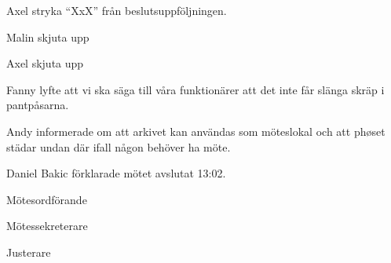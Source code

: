 \documentclass[10pt]{article}
\def\mo{Daniel Bakic}
\def\ms{Axel Voss}
\def\ji{Malin Heyden}
\begin{document}
\begin{paragrafer}
	
	
	Axel \ypa stryka ``XxX'' från beslutsuppföljningen. 

	\Mbaby 

	Malin \ypa skjuta upp 

	Axel \ypa skjuta upp
	
	
	
	
	Fanny lyfte att vi ska säga till våra funktionärer att det inte får slänga skräp i pantpåsarna. 

	Andy informerade om att arkivet kan användas som möteslokal och att phøset städar undan där ifall någon behöver ha möte.


	{\mo} förklarade mötet avslutat 13:02.
\end{paragrafer}

\hidesignfoot
\begin{signatures}{3}
	\signature{\mo}{Mötesordförande}
	\signature{\ms}{Mötessekreterare}
	\signature{\ji}{Justerare}
\end{signatures}
\end{document}
